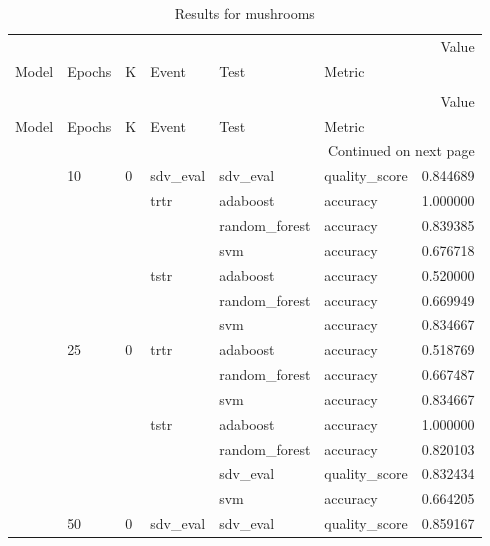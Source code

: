 \begin{longtable}{llllllr}
\caption{Results for mushrooms} \\
\toprule
 &  &  &  &  &  & Value \\
Model & Epochs & K & Event & Test & Metric &  \\
\midrule
\endfirsthead
\caption[]{Results for mushrooms} \\
\toprule
 &  &  &  &  &  & Value \\
Model & Epochs & K & Event & Test & Metric &  \\
\midrule
\endhead
\midrule
\multicolumn{7}{r}{Continued on next page} \\
\midrule
\endfoot
\bottomrule
\endlastfoot
\multirow[t]{35}{*}{CTGAN} & \multirow[t]{7}{*}{10} & \multirow[t]{7}{*}{0} & sdv_eval & sdv_eval & quality_score & 0.844689 \\
\cline{4-7} \cline{5-7}
 &  &  & \multirow[t]{3}{*}{trtr} & adaboost & accuracy & 1.000000 \\
\cline{5-7}
 &  &  &  & random_forest & accuracy & 0.839385 \\
\cline{5-7}
 &  &  &  & svm & accuracy & 0.676718 \\
\cline{4-7} \cline{5-7}
 &  &  & \multirow[t]{3}{*}{tstr} & adaboost & accuracy & 0.520000 \\
\cline{5-7}
 &  &  &  & random_forest & accuracy & 0.669949 \\
\cline{5-7}
 &  &  &  & svm & accuracy & 0.834667 \\
\cline{2-7} \cline{3-7} \cline{4-7} \cline{5-7}
 & \multirow[t]{7}{*}{25} & \multirow[t]{7}{*}{0} & \multirow[t]{3}{*}{trtr} & adaboost & accuracy & 0.518769 \\
\cline{5-7}
 &  &  &  & random_forest & accuracy & 0.667487 \\
\cline{5-7}
 &  &  &  & svm & accuracy & 0.834667 \\
\cline{4-7} \cline{5-7}
 &  &  & \multirow[t]{4}{*}{tstr} & adaboost & accuracy & 1.000000 \\
\cline{5-7}
 &  &  &  & random_forest & accuracy & 0.820103 \\
\cline{5-7}
 &  &  &  & sdv_eval & quality_score & 0.832434 \\
\cline{5-7}
 &  &  &  & svm & accuracy & 0.664205 \\
\cline{2-7} \cline{3-7} \cline{4-7} \cline{5-7}
 & \multirow[t]{7}{*}{50} & \multirow[t]{7}{*}{0} & sdv_eval & sdv_eval & quality_score & 0.859167 \\
\cline{4-7} \cline{5-7}

\end{longtable}
